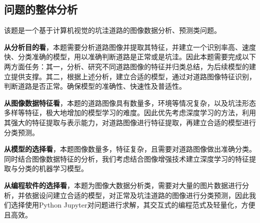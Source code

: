 \documentclass{MathorCupmodeling}
\begin{document}
	\subsection{问题的整体分析}
	该题是一个基于计算机视觉的坑洼道路的图像数据分析、预测类问题。

	\textbf{从分析目的看}，本题需要分析道路图像并提取其特征，并建立一个识别率高、速度快、分类准确的模型，用以准确判断道路是正常或是坑洼。因此本题需要完成以下两方面任务：{\heiti 其一}，分析、研究不同道路图像的特征并归类总结，为后续模型的建立提供支撑。{\heiti 其二}，根据上述分析，建立合适的模型，通过对道路图像特征识别，判断道路是否正常。确保模型的准确性、快速性及普适性。

	\textbf{从图像数据特征看}，本题的道路图像具有数量多，环境等情况复杂，以及坑洼形态多样等特征，极大地增加的模型学习的难度。因此优先考虑深度学习的方法，利用其强大的特征提取与表示能力，对道路图像进行特征提取，再建立合适的模型进行分类预测。

	\textbf{从模型的选择看}，本题图像数量多，特征复杂，且需要对道路图像做出准确分类。同时结合图像数据特征的分析，我们考虑结合图像增强技术建立深度学习的特征提取与分类的机器学习模型。

	\textbf{从编程软件的选择看}，本题为图像大数据分析类，需要对大量的图片数据进行分析，并依据设问建立合适的模型，对正常及坑洼道路的图像进行分类预测，因此我们选择使用Python Jupyter对问题进行求解，其交互式的编程范式及轻量化，方便且高效。
\end{document}
